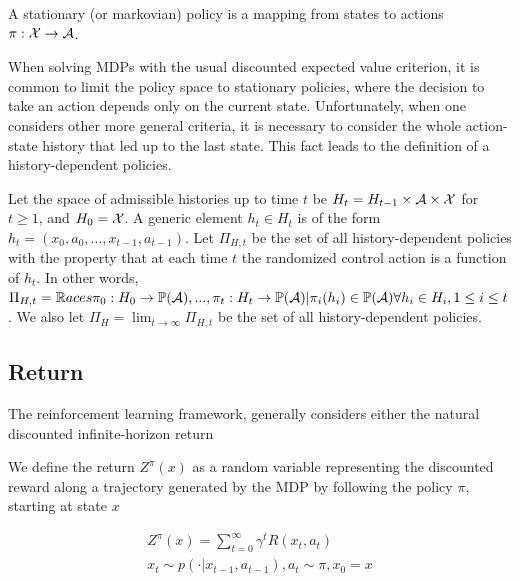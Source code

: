 \begin{definition}
A stationary (or markovian) policy is a mapping from states to actions $\pi:\mathcal{X} \to \mathcal{A}$.
\end{definition}

When solving MDPs with the usual discounted expected value criterion, it is common to limit the policy space to stationary policies, where the decision to take an action depends only on the current state. Unfortunately, when one considers other more general criteria, it is necessary to consider the whole action-state history that led up to the last state. This fact leads to the definition of a history-dependent policies.

\begin{definition}
Let the space of admissible histories up to time $t$ be $H_t = H_{t-1} \times \mathcal{A} \times \mathcal{X}$ for $t \ge 1$, and $H_0 = \mathcal{X}$. A generic element $h_t \in H_t$ is of the form $h_t = (x_0, a_0, ..., x_{t-1}, a_{t-1})$. Let $\Pi_{H,t}$ be the set of all history-dependent policies with the property that at each time $t$ the randomized control action is a function of $h_t$. In other words, 
$\Pi_{H,t} = \mathbb{R}aces{\pi_0: H_0 \to \mathbb{P}(\mathcal{A}), ..., \pi_t: H_t \to \mathbb{P}(\mathcal{A})|\pi_i(h_i) \in \mathbb{P}(\mathcal{A}) \forall h_i \in H_i, 1\le i\le t}$. We also let $\Pi_H = \lim_{t\to\infty}\Pi_{H,t}$ be the set of all history-dependent policies.
\end{definition}


\subsection{Return}

The reinforcement learning framework, generally considers either the natural discounted infinite-horizon return 



We define the return $Z^\pi(x)$ as a random variable representing the discounted reward along a trajectory generated by the MDP by following the policy $\pi$, starting at state $x$

\begin{equation}
\begin{split}
Z^\pi(x)=\sum_{t=0}^\infty \gamma^tR(x_t,a_t)\\
x_t \sim p(\cdot|x_{t-1}, a_{t-1}), a_t \sim \pi, x_0 = x
\end{split}
\end{equation}

